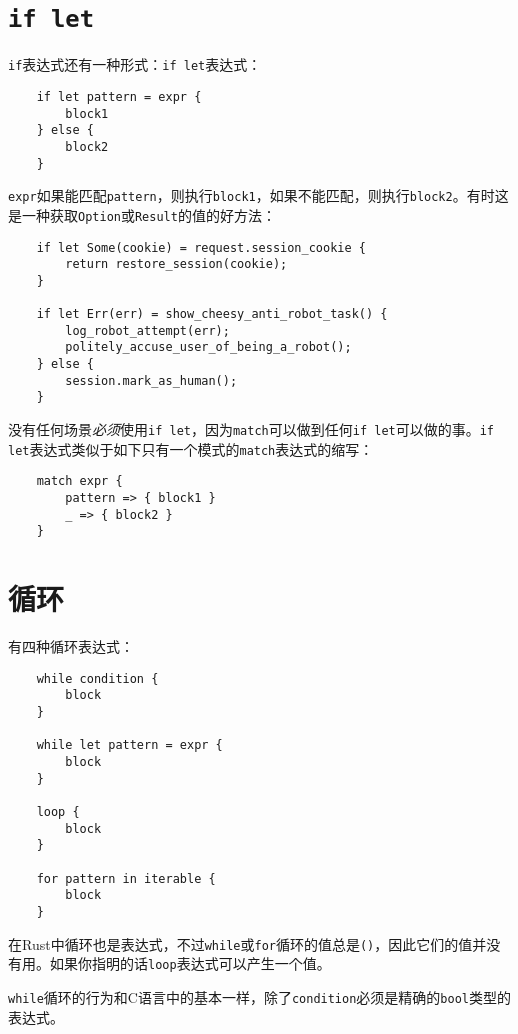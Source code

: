 \section{\texttt{if let}}\label{iflet}

\texttt{if}表达式还有一种形式：\texttt{if let}表达式：
\begin{verbatim}
    if let pattern = expr {
        block1
    } else {
        block2
    }
\end{verbatim}

\texttt{expr}如果能匹配\texttt{pattern}，则执行\texttt{block1}，如果不能匹配，则执行\texttt{block2}。有时这是一种获取\texttt{Option}或\texttt{Result}的值的好方法：
\begin{verbatim}
    if let Some(cookie) = request.session_cookie {
        return restore_session(cookie);
    }

    if let Err(err) = show_cheesy_anti_robot_task() {
        log_robot_attempt(err);
        politely_accuse_user_of_being_a_robot();
    } else {
        session.mark_as_human();
    }
\end{verbatim}

没有任何场景\emph{必须}使用\texttt{if let}，因为\texttt{match}可以做到任何\texttt{if let}可以做的事。\texttt{if let}表达式类似于如下只有一个模式的\texttt{match}表达式的缩写：
\begin{verbatim}
    match expr {
        pattern => { block1 }
        _ => { block2 }
    }
\end{verbatim}

\section{循环}\label{loop}

有四种循环表达式：
\begin{verbatim}
    while condition {
        block
    }
    
    while let pattern = expr {
        block
    }

    loop {
        block
    }

    for pattern in iterable {
        block
    }
\end{verbatim}

在Rust中循环也是表达式，不过\texttt{while}或\texttt{for}循环的值总是\texttt{()}，因此它们的值并没有用。如果你指明的话\texttt{loop}表达式可以产生一个值。

\texttt{while}循环的行为和C语言中的基本一样，除了\texttt{condition}必须是精确的\texttt{bool}类型的表达式。

